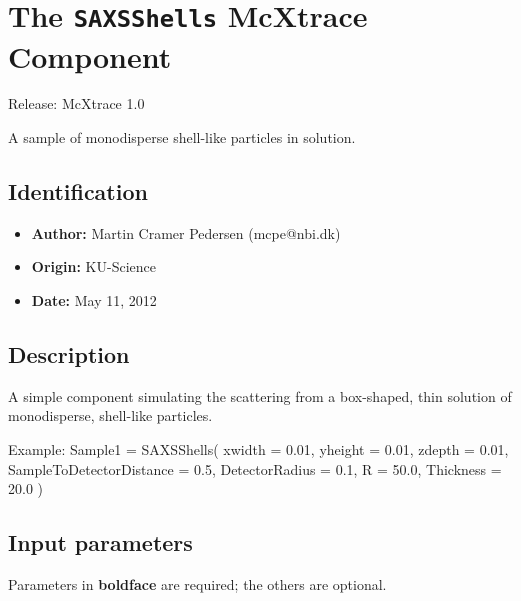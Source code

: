\section{The \texttt{SAXSShells} McXtrace Component}
Release: McXtrace 1.0

A sample of monodisperse shell-like particles in solution.

\subsection*{Identification}
\begin{itemize}
  \item \textbf{Author:} Martin Cramer Pedersen (mcpe@nbi.dk)
  \item \textbf{Origin:} KU-Science
  \item \textbf{Date:} May 11, 2012
\end{itemize}

\subsection*{Description}
A simple component simulating the scattering from a box-shaped, thin solution of monodisperse, shell-like particles.

Example: Sample1 = SAXSShells( xwidth = 0.01, yheight = 0.01, zdepth = 0.01, SampleToDetectorDistance = 0.5, DetectorRadius = 0.1, R = 50.0, Thickness = 20.0 )

\subsection*{Input parameters}
Parameters in \textbf{boldface} are required; the others are optional.

